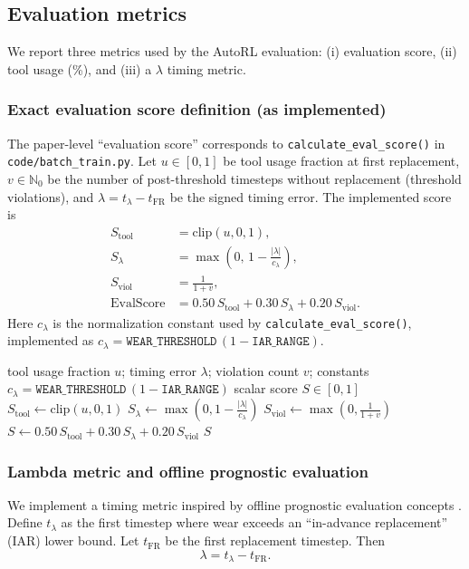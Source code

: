 \documentclass[refree,sn-basic]{sn-jnl} %
\begin{document}
\subsection{Evaluation metrics}
\label{sec:metrics}
We report three metrics used by the AutoRL evaluation: (i) evaluation score, (ii) tool usage (\%), and (iii) a $\lambda$ timing metric.

\subsubsection{Exact evaluation score definition (as implemented)}
The paper-level ``evaluation score'' corresponds to \texttt{calculate\_eval\_score()} in \texttt{code/batch\_train.py}. Let $u\in[0,1]$ be tool usage fraction at first replacement, $v\in\mathbb{N}_0$ be the number of post-threshold timesteps without replacement (threshold violations), and $\lambda=t_{\lambda}-t_{\mathrm{FR}}$ be the signed timing error. The implemented score is
\begin{align}
S_{\text{tool}} &= \mathrm{clip}(u,0,1),\\
S_{\lambda} &= \max\left(0,\,1-\frac{|\lambda|}{c_{\lambda}}\right),\\
S_{\text{viol}} &= \frac{1}{1+v},\\
\mathrm{EvalScore} &= 0.50\,S_{\text{tool}} + 0.30\,S_{\lambda} + 0.20\,S_{\text{viol}}.
\end{align}
Here $c_{\lambda}$ is the normalization constant used by \texttt{calculate\_eval\_score()}, implemented as $c_{\lambda}=\texttt{WEAR\_THRESHOLD}\,(1-\texttt{IAR\_RANGE})$.

\begin{algorithm}[t]
\caption{Evaluation score computation (per evaluation run)}
\label{alg:eval_score}
\begin{algorithmic}[1]
\Require tool usage fraction $u$; timing error $\lambda$; violation count $v$; constants $c_{\lambda}=\texttt{WEAR\_THRESHOLD}\,(1-\texttt{IAR\_RANGE})$
\Ensure scalar score $S\in[0,1]$
\State $S_{\mathrm{tool}} \gets \mathrm{clip}(u, 0, 1)$
\State $S_{\lambda} \gets \max\left(0, 1 - \frac{|\lambda|}{c_{\lambda}}\right)$
\State $S_{\mathrm{viol}} \gets \max\left(0, \frac{1}{1+v}\right)$
\State $S \gets 0.50\,S_{\mathrm{tool}} + 0.30\,S_{\lambda} + 0.20\,S_{\mathrm{viol}}$
\State \Return $S$
\end{algorithmic}
\end{algorithm}

\subsubsection{Lambda metric and offline prognostic evaluation}
We implement a timing metric inspired by offline prognostic evaluation concepts \cite{Saxena2010Metrics}. Define $t_{\lambda}$ as the first timestep where wear exceeds an ``in-advance replacement'' (IAR) lower bound. Let $t_{\mathrm{FR}}$ be the first replacement timestep. Then
\begin{equation}
        \lambda = t_{\lambda} - t_{\mathrm{FR}}.
\end{equation}
\end{document}
